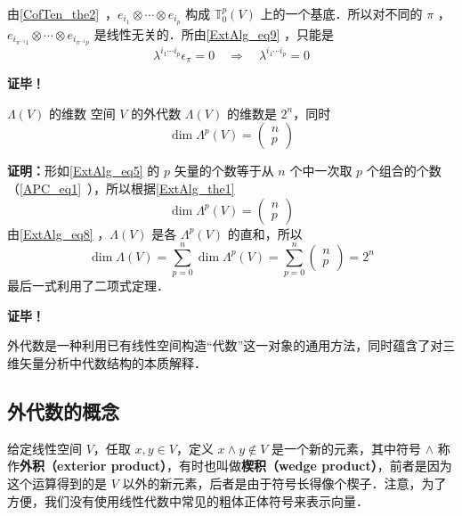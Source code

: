 由\autoref{CofTen_the2}~，$e_{i_1}\otimes\cdots\otimes e_{i_p}$ 构成 $\mathbb T_0^p(V)$ 上的一个基底．所以对不同的 $\pi$ ，$e_{i_{\pi^{-1} 1}}\otimes\cdots\otimes e_{i_{\pi^{-1} p}}$ 是线性无关的．所由\autoref{ExtAlg_eq9} ，只能是
\begin{equation}
\lambda^{i_1\cdots i_p}\epsilon_\pi=0\quad\Rightarrow\quad\lambda^{i_1\cdots i_p}=0
\end{equation}

\textbf{证毕！}
\begin{corollary}{ $\Lambda(V)$ 的维数}
空间 $V$ 的外代数 $\Lambda(V)$ 的维数是 $2^n$，同时
\begin{equation}
\dim\Lambda^p(V)=\left(\begin{aligned}
n\\p
\end{aligned}\right)
\end{equation}
\end{corollary}
\textbf{证明：}形如\autoref{ExtAlg_eq5} 的 $p$ 矢量的个数等于从 $n$ 个中一次取 $p$ 个组合的个数（\autoref{APC_eq1}~），所以根据\autoref{ExtAlg_the1} 
\begin{equation}
\dim\Lambda^p(V)=\left(\begin{aligned}
n\\p
\end{aligned}\right)
\end{equation}
由\autoref{ExtAlg_eq8} ，$\Lambda(V)$ 是各 $\Lambda^p(V)$ 的直和，所以
\begin{equation}
\dim\Lambda(V)=\sum_{p=0}^n\dim\Lambda^p(V)=\sum_{p=0}^n\left(\begin{aligned}
n\\p
\end{aligned}\right)=2^n
\end{equation}
 最后一式利用了二项式定理．

\textbf{证毕！}

外代数是一种利用已有线性空间构造“代数”这一对象的通用方法，同时蕴含了对三维矢量分析中代数结构的本质解释．

\subsection{外代数的概念}

给定线性空间 $V$，任取 $x, y\in V$，定义 $x\wedge y\not\in V$ 是一个新的元素，其中符号 $\wedge$ 称作\textbf{外积（exterior product）}，有时也叫做\textbf{楔积（wedge product）}，前者是因为这个运算得到的是 $V$ 以外的新元素，后者是由于符号长得像个楔子．注意，为了方便，我们没有使用线性代数中常见的粗体正体符号来表示向量．

